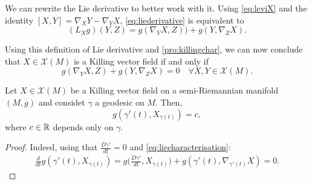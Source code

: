 We can rewrite the Lie derivative to better work with it. Using \autoref{eq:leviX} and the identity $[X,Y] = \nabla_X Y - \nabla_Y X$, \autoref{eq:liederivative} is equivalent to
\begin{equation}
	\label{liederivative2}
	(L_Xg)(Y,Z) = g(\nabla_Y X, Z)) + g(Y, \nabla_Z X).
\end{equation}

Using this definition of Lie derivative and \autoref{pro:killingchar}, we can now conclude that $X \in \mathcal{X}(M)$ is a Killing vector field if and only if
\begin{equation}
	\label{eq:liecharacterisation}
	g(\nabla_Y X, Z) + g(Y, \nabla_Z X) = 0 \quad \forall X,Y\in\mathcal{X}(M).
\end{equation}

\begin{proposition}
	Let $X\in\mathcal{X}(M)$ be a Killing vector field on a semi-Riemannian manifold $(M,g)$ and considet $\gamma$ a geodesic on $M$. Then,
	\[
		g(\gamma'(t), X_{\gamma(t)}) = c,
	\]
	where $c\in\mathbb{R}$ depends only on $\gamma$.
\end{proposition}

\begin{proof}
	Indeed, using that $\frac{D\gamma'}{dt} = 0$ and \autoref{eq:liecharacterisation}:
	\begin{align*}
		\frac{d}{dt} g\left(\gamma'(t),X_{\gamma(t)}\right) = g\biggl(\frac{D\gamma'}{dt}, X_{\gamma(t)}\biggr) + g\left(\gamma'(t), \nabla_{\gamma'(t)}X\right) = 0.
	\end{align*}
\end{proof}